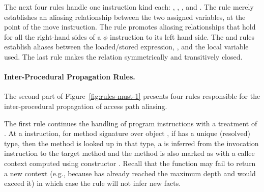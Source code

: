 
The next four  rules handle one instruction kind each:
, , , and . The
 rule merely establishes an aliasing relationship between the
two assigned variables, at the point of the move instruction. The
 rule promotes aliasing relationships that hold for all the
right-hand sides of a $\phi$ instruction to its left hand side. The
 and  rules establish aliases between the
loaded/stored expression, , and the local variable used.  The
last  rule makes the  relation
symmetrically and transitively closed.


\paragraph{Inter-Procedural Propagation Rules.}

The second part of Figure~\ref{fig:rules-must-1} presents four rules
responsible for the inter-procedural propagation of access path aliasing.

The first rule continues the handling of program instructions with a treatment
of . At a  instruction, for method signature
 over object , if  has a unique (resolved)
type, then the method is looked up in that type, a 
is inferred from the invocation instruction to the target method and the method
is also marked as  with a callee context computed using
constructor . Recall that the 
function may fail to return a new context (e.g., because  has already
reached the maximum depth and  would exceed it) in which case the
rule will not infer new facts.

